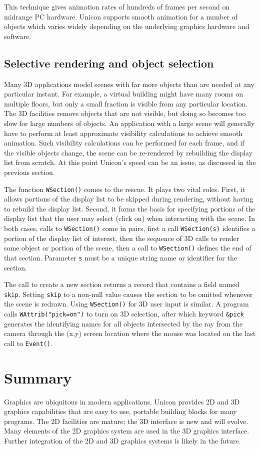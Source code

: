 This technique gives animation rates of hundreds of frames per second
on midrange PC hardware. Unicon supports smooth animation for a number
of objects which varies widely depending on the underlying graphics
hardware and software.

\subsection*{Selective rendering and object selection}

Many 3D applications model scenes with far more objects than are
needed at any particular instant. For example, a virtual building
might have many rooms on multiple floors, but only a small fraction is
visible from any particular location. The 3D facilities remove objects
that are not visible, but doing so becomes too slow for large numbers
of objects. An application with a large scene will generally have to
perform at least approximate visibility calculations to achieve smooth
animation. Such visibility calculations can be performed for each
frame, and if the visible objects change, the scene can be re-rendered
by rebuilding the display list from scratch. At this point Unicon's
speed can be an issue, as discussed in the previous section.

The function \texttt{WSection()} comes to the rescue. It plays two
vital roles. First, it allows portions of the display list to be
skipped during rendering, without having to rebuild the display
list. Second, it forms the basis for specifying portions of the
display list that the user may select (click on) when interacting with
the scene. In both cases, calls to \texttt{WSection()} come in pairs,
first a call \texttt{WSection(s)} identifies a portion of the display
list of interest, then the sequence of 3D calls to render some object
or portion of the scene, then a call to \texttt{WSection()} defines
the end of that section. Parameter \texttt{s} must be a unique string
name or identifier for the section.

The call to create a new section returns a record that contains a
field named \texttt{skip}. Setting \texttt{skip} to a non-null value
causes the section to be omitted whenever the scene is redrawn. Using
\texttt{WSection()} for 3D user input is similar. A program calls
\texttt{WAttrib("pick=on")} to turn on 3D selection, after which
keyword \texttt{\&pick} generates the identifying names for all
objects intersected by the ray from the camera through the (x,y)
screen location where the mouse was located on the last call to
\texttt{Event()}.

\section{Summary}

Graphics are ubiquitous in modern applications. Unicon provides 2D and
3D graphics capabilities that are easy to use, portable building
blocks for many programs. The 2D facilities are mature; the 3D
interface is new and will evolve. Many elements of the 2D graphics
system are used in the 3D graphics interface. Further integration of
the 2D and 3D graphics systems is likely in the future.
